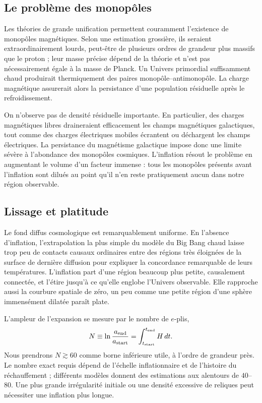 \subsection{Le problème des monopôles}

Les théories de grande unification permettent couramment l’existence de monopôles magnétiques. Selon une estimation grossière, ils seraient extraordinairement lourds, peut-être de plusieurs ordres de grandeur plus massifs que le proton ; leur masse précise dépend de la théorie et n’est pas nécessairement égale à la masse de Planck. Un Univers primordial suffisamment chaud produirait thermiquement des paires monopôle--antimonopôle. La charge magnétique assurerait alors la persistance d’une population résiduelle après le refroidissement.

On n’observe pas de densité résiduelle importante. En particulier, des charges magnétiques libres draineraient efficacement les champs magnétiques galactiques, tout comme des charges électriques mobiles écrantent ou déchargent les champs électriques. La persistance du magnétisme galactique impose donc une limite sévère à l’abondance des monopôles cosmiques. L’inflation résout le problème en augmentant le volume d’un facteur immense : tous les monopôles présents avant l’inflation sont dilués au point qu’il n’en reste pratiquement aucun dans notre région observable.

\subsection{Lissage et platitude}

Le fond diffus cosmologique est remarquablement uniforme. En l’absence d’inflation, l’extrapolation la plus simple du modèle du Big Bang chaud laisse trop peu de contacts causaux ordinaires entre des régions très éloignées de la surface de dernière diffusion pour expliquer la concordance remarquable de leurs températures. L’inflation part d’une région beaucoup plus petite, causalement connectée, et l’étire jusqu’à ce qu’elle englobe l’Univers observable. Elle rapproche aussi la courbure spatiale de zéro, un peu comme une petite région d’une sphère immensément dilatée paraît plate.

L’ampleur de l’expansion se mesure par le nombre de \(e\)-plis,
\begin{equation}
N\equiv \ln\frac{a_{\rm end}}{a_{\rm start}}
=\int_{t_{\rm start}}^{t_{\rm end}}H\,dt.
\label{eq:c09-efolds}
\end{equation}
Nous prendrons \(N\gtrsim60\) comme borne inférieure utile, à l’ordre de grandeur près. Le nombre exact requis dépend de l’échelle inflationnaire et de l’histoire du réchauffement ; différents modèles donnent des estimations aux alentours de \(40\)--\(80\). Une plus grande irrégularité initiale ou une densité excessive de reliques peut nécessiter une inflation plus longue.


